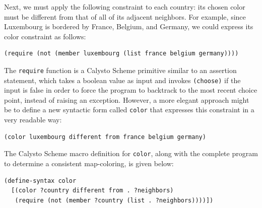 \documentclass[acmsmall,screen,authorversion]{acmart}
\begin{document}
\noindent
Next, we must apply the following constraint to each country: its chosen color
must be different from that of all of its adjacent neighbors.  For example,
since Luxembourg is bordered by France, Belgium, and Germany, we could express
its color constraint as follows:

{\small
\begin{verbatim}
(require (not (member luxembourg (list france belgium germany))))
\end{verbatim}
}

\noindent
The \texttt{require} function is a Calysto Scheme primitive similar to an
assertion statement, which takes a boolean value as input and invokes
\texttt{(choose)} if the input is false in order to force the program to
backtrack to the most recent choice point, instead of raising an exception.
However, a more elegant approach might be to define a new syntactic form called
\texttt{color} that expresses this constraint in a very readable way:

{\small
\begin{verbatim}
(color luxembourg different from france belgium germany)
\end{verbatim}
}

\noindent
The Calysto Scheme macro definition for \texttt{color}, along with the complete
program to determine a consistent map-coloring, is given below:

{\small
\begin{verbatim}
(define-syntax color
  [(color ?country different from . ?neighbors)
   (require (not (member ?country (list . ?neighbors))))])
\end{verbatim}
}
\end{document}
